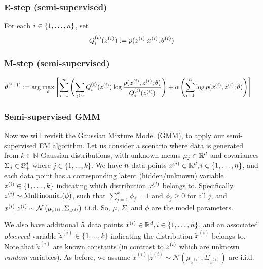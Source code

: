 \subsubsection*{E-step (semi-supervised)}

For each $i \in \{1,\ldots,{n}\}$, set
\begin{align*}
    Q_i^{(t)}(z^{(i)}) := p(z^{(i)}|x^{(i)};\theta^{(t)})
\end{align*}

\subsubsection*{M-step (semi-supervised)}

\begin{align*}
    \theta^{(t+1)} &:= \arg\max_\theta\left[ \sum_{i=1}^{n}\left( \sum_{z^{(i)}} Q^{(t)}_i(z^{(i)}) \log \frac{ p(x^{(i)}, z^{(i)};\theta) }{ Q^{(t)}_i(z^{(i)})}\right)  + \alpha \left(\sum_{i=1}^{\tilde{{n}}} \log p(\tilde{x}^{(i)},\tilde{z}^{(i)};\theta)\right)\right]
\end{align*}

\begin{enumerate}
  
\ifnum{} {
  
} \fi

\end{enumerate}


\subsubsection*{Semi-supervised GMM}
Now we will revisit the Gaussian Mixture Model (GMM), to apply our semi-supervised EM algorithm. Let us consider a scenario where data is generated from $k \in \mathbb{N}$ Gaussian distributions, with unknown means $\mu_j \in \mathbb{R}^{d}$ and covariances $\Sigma_j \in \mathbb{S}_+^{d}$ where $j \in \{1,\ldots,k\}$. We have ${n}$ data points $x^{(i)} \in \mathbb{R}^{d}, i \in \{1,\ldots,{n}\}$, and each data point has a corresponding latent (hidden/unknown) variable $z^{(i)} \in \{1,\ldots,k\}$ indicating which distribution $x^{(i)}$ belongs to. Specifically, $z^{(i)} \sim \text{Multinomial}(\phi)$, such that $\sum_{j=1}^k\phi_j = 1$ and $\phi_j \ge 0$ for all $j$, and $x^{(i)}|z^{(i)} \sim \mathcal{N}\left(\mu_{z^{(i)}}, \Sigma_{z^{(i)}}\right)$ i.i.d. So, $\mu$, $\Sigma$, and $\phi$ are the model parameters.

We also have additional $\tilde{{n}}$ data points $\tilde{x}^{(i)} \in \mathbb{R}^{d}, i \in \{1,\ldots,\tilde{{n}}\}$, and an associated \emph{observed} variable $\tilde{z}^{(i)} \in \{1,\ldots,k\}$ indicating the distribution $\tilde{x}^{(i)}$ belongs to. Note that $\tilde{z}^{(i)}$ are known constants (in contrast to $z^{(i)}$ which are unknown \emph{random} variables). As before, we assume $\tilde{x}^{(i)}|\tilde{z}^{(i)} \sim \mathcal{N}\left(\mu_{\tilde{z}^{(i)}}, \Sigma_{\tilde{z}^{(i)}}\right)$ are i.i.d.


